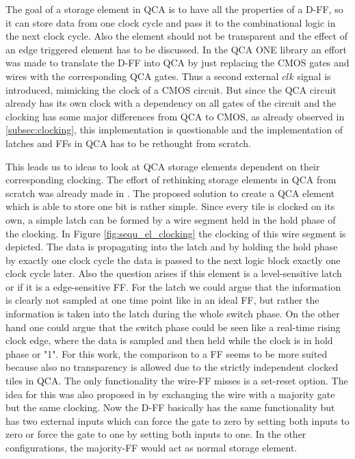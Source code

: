 The goal of a storage element in QCA is to have all the properties of a D-FF, so it can store data from one clock cycle and pass it to the combinational logic in the next clock cycle. Also the element should not be transparent and the effect of an edge triggered element has to be discussed. In the QCA ONE library an effort was made to translate the D-FF into QCA by just replacing the CMOS gates and wires with the corresponding QCA gates. Thus a second external $clk$ signal is introduced, mimicking the clock of a CMOS circuit. But since the QCA circuit already has its own clock with a dependency on all gates of the circuit and the clocking has some major differences from QCA to CMOS, as already observed in \ref{subsec:clocking}, this implementation is questionable and the implementation of latches and FFs in QCA has to be rethought from scratch.

This leads us to ideas to look at QCA storage elements dependent on their corresponding clocking.
The effort of rethinking storage elements in QCA from scratch was already made in \cite{torres2018synchronization}. The proposed solution to create a QCA element which is able to store one bit is rather simple. Since every tile is clocked on its own, a simple latch can be formed by a wire segment held in the hold phase of the clocking. In Figure \ref{fig:sequ_el_clocking} the clocking of this wire segment is depicted. The data is propagating into the latch and by holding the hold phase by exactly one clock cycle the data is passed to the next logic block exactly one clock cycle later. Also the question arises if this element is a level-sensitive latch or if it is a edge-sensitive FF. For the latch we could argue that the information is clearly not sampled at one time point like in an ideal FF, but rather the information is taken into the latch during the whole switch phase. On the other hand one could argue that the switch phase could be seen like a real-time rising clock edge, where the data is sampled and then held while the clock is in hold phase or "1". For this work, the comparison to a FF seems to be more suited because also no transparency is allowed due to the strictly independent clocked tiles in QCA. The only functionality the wire-FF misses is a set-reset option. The idea for this was also proposed in \cite{Walter} by exchanging the wire with a majority gate but the same clocking. Now the D-FF basically has the same functionality but has two external inputs which can force the gate to zero by setting both inputs to zero or force the gate to one by setting both inputs to one. In the other configurations, the majority-FF would act as normal storage element.

